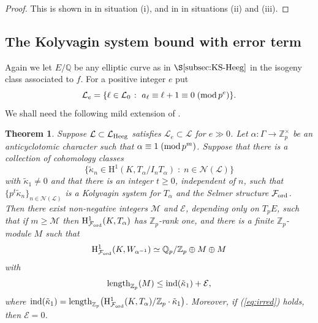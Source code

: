 \documentclass[10pt,reqno]{amsart}
\numberwithin{equation}{section}
\theoremstyle{plain}
\newtheorem{thm}{Theorem}[subsection] %
\theoremstyle{definition}
\newtheorem{rem}[thm]{Remark}
\theoremstyle{definition}
\theoremstyle{plain}
\theoremstyle{plain}
\theoremstyle{plain}
\theoremstyle{plain}
\theoremstyle{plain}
\theoremstyle{plain}
\newcommand{\ind}{\operatorname{ind}}
\newcommand{\Z}{\mathbb{Z}}
\newcommand{\Q}{\mathbb{Q}}
\newcommand{\CE}{\mathcal{E}}
\newcommand{\CM}{\mathcal{M}}
\newcommand{\Fcal}{\mathcal{F}}
\newcommand{\cL}{\mathcal{L}}
\newcommand{\rH}{\mathrm{H}}
\begin{document}
\begin{proof}
This is shown in \cite{eisenstein_cyc} in situation (i), and in \cite{bcs} in situations (ii) and (iii).
\end{proof}


\subsection{The Kolyvagin system bound with error term}

Again we let $E/\Q$ be any elliptic curve as in $\S\ref{subsec:KS-Heeg}$ in the isogeny class associated to $f$. For a positive integer $e$ put
\[ 
\mathcal{L}_e=\{\ell\in\mathcal{L}_0\;\colon\;a_\ell\equiv\ell+1\equiv 0\;({\rm mod}\,p^e)\}.
\] 
We shall need the following mild extension of \cite[Thm.~6.1.1]{eisenstein_cyc}. 

\begin{thm}\label{thm:bound}
Suppose $\mathcal{L}\subset\mathcal{L}_{\rm Heeg}$ satisfies $\mathcal{L}_e\subset\mathcal{L}$ for $e\gg 0$. 
Let $\alpha:\Gamma\to \Z_p^{\times}$ be an anticyclotomic character such that $\alpha\equiv 1\;({\rm mod}\,p^m)$. Suppose that there is a collection of cohomology classes 
\[
\{\tilde{\kappa}_n\in\rH^1(K,T_\alpha/I_nT_\alpha)\;\colon\;n\in\mathcal{N}(\mathcal{L})\}
\]
with $\tilde{\kappa}_1\neq 0$ and that there is an integer $t\geq 0$, independent of $n$, such that 
$\{p^t\tilde{\kappa}_n\}_{n\in\mathcal{N}(\mathcal{L})}$ is a Kolyvagin system for $T_\alpha$ and the Selmer structure $\Fcal_{\rm ord}$. 
Then there exist non-negative integers $\CM$ and $\CE$, depending only on $T_pE$, such that if
$m\geq \CM$ then $\rH^1_{\Fcal_{\rm ord}}(K,T_{\alpha})$ has $\Z_p$-rank one, and there is a finite $\Z_p$-module $M$ such that
\[
{\rm H}^1_{\Fcal_{\rm ord}}(K,W_{\alpha^{-1}})\simeq \Q_p/\Z_p \oplus M\oplus M
\]
with 
\[
{\rm length}_{\Z_p}(M)\leq \ind(\tilde{\kappa}_1)+\CE,
\]
where $\ind(\tilde{\kappa}_1)={\rm length}_{\Z_p}\bigl({\rm H}^1_{\Fcal_{\rm ord}}(K,T_{\alpha})/\Z_p\cdot\tilde{\kappa}_{1}\bigr)$. Moreover, if {\rm (\ref{eq:irred})} holds, then $\mathcal{E}=0$.
\end{thm}
\end{document}
